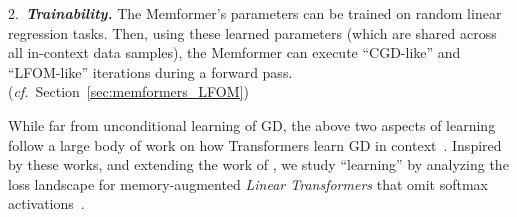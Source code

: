 \documentclass[11pt]{article}
\theoremstyle{plain}
\theoremstyle{definition}
\theoremstyle{remark}
\newcommand{\bemph}[1]{\textbf{\emph{#1}}}
\numberwithin{equation}{section}
\begin{document}
2.~\bemph{Trainability.} The Memformer's parameters can be trained on random linear regression tasks. Then, using these learned parameters (which are shared across all in-context data samples), the Memformer can execute ``CGD-like'' and ``LFOM-like'' iterations during a forward pass. (\emph{cf.}~Section~\ref{sec:memformers_LFOM})

While far from unconditional learning of GD, the above two aspects of learning follow a large body of work on how Transformers learn GD in context~\citep{garg2022can, akyurek2022learning, von2023transformers, ahn2024transformers, zhang2024trained}. Inspired by these works, and extending the work of \citet{ahn2024transformers}, we study ``learning'' by analyzing the loss landscape for memory-augmented \emph{Linear Transformers} that omit softmax activations~\citep{schlag2021linear, von2023transformers, ahn2024transformers}.

\vspace*{-3pt}
\end{document}
